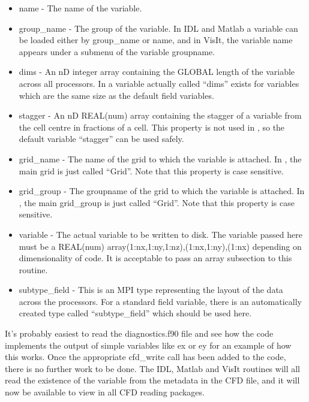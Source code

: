 \documentclass[12pt,a4paper]{article}
\newcommand{\EPOCH}{{\color{warwickdark}\fontfamily{phv}\selectfont{EPOCH}}}
\begin{document}
\begin{itemize}
\item name - The name of the variable.
\item group\_name - The group of the variable. In IDL and Matlab a variable can
  be loaded either by group\_name or name, and in VisIt, the variable name
  appears under a submenu of the variable groupname.
\item dims - An nD integer array containing the GLOBAL length of the variable
  across all processors. In {\EPOCH} a variable actually called ``dims'' exists
  for variables which are the same size as the default field variables.
\item stagger - An nD REAL(num) array containing the stagger of a variable from
  the cell centre in fractions of a cell. This property is not used in {\EPOCH},
  so the default variable ``stagger'' can be used safely.
\item grid\_name - The name of the grid to which the variable is attached. In
  {\EPOCH}, the main grid is just called ``Grid''. Note that this property is
  case sensitive.
\item grid\_group - The groupname of the grid to which the variable is
  attached. In {\EPOCH}, the main grid\_group is just called ``Grid''. Note that
  this property is case sensitive.
\item variable - The actual variable to be written to disk. The variable passed
  here must be a REAL(num) array(1:nx,1:ny,1:nz),(1:nx,1:ny),(1:nx) depending
  on dimensionality of code. It is acceptable to pass an array subsection to
  this routine.
\item subtype\_field - This is an MPI type representing the layout of the data
  across the processors. For a standard field variable, there is an
  automatically created type called ``subtype\_field'' which should be used
  here.
\end{itemize}

It's probably easiest to read the diagnostics.f90 file and see how the code
implements the output of simple variables like ex or ey for an example of how
this works. Once the appropriate cfd\_write call has
been added to the code, there is no further work
to be done. The IDL, Matlab and VisIt routines will all read the existence of
the variable from the metadata in the CFD file, and it will now be available to
view in all CFD reading packages.
\end{document}

